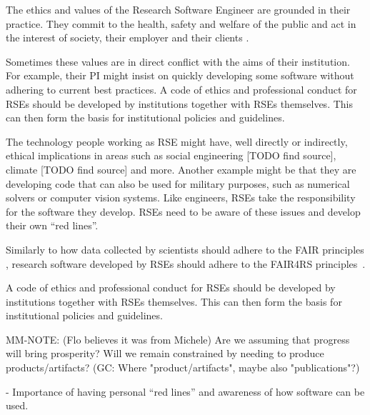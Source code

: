\documentclass{eceasst}
\begin{document}
The ethics and values of the Research Software Engineer are grounded in their practice.
They commit to the health, safety and welfare of the public and act in the interest of society, their employer and their clients \cite{Goth2023}.

Sometimes these values are in direct conflict with the aims of their institution. For example, their PI might insist on quickly developing some software without adhering to current best practices.
A code of ethics and professional conduct for RSEs should be developed by institutions together with RSEs themselves. This can then form the basis for institutional policies and guidelines.

The technology people working as RSE might have, well directly or indirectly, ethical implications in areas such as social engineering [TODO find source], climate [TODO find source] and more.
Another example might be that they are developing code that can also be used for military purposes, such as numerical solvers or computer vision systems.
Like engineers, RSEs take the responsibility for the software they develop.
RSEs need to be aware of these issues and develop their own ``red lines''.

Similarly to how data collected by scientists should adhere to the FAIR principles \cite{FAIR}, research software developed by RSEs should adhere to the FAIR4RS principles~\cite{FAIR4RS}.

A code of ethics and professional conduct for RSEs should be developed by institutions together with RSEs themselves.
This can then form the basis for institutional policies and guidelines.

MM-NOTE: (Flo believes it was from Michele) Are we assuming that progress will bring prosperity? Will we remain constrained by needing to produce products/artifacts? (GC: Where "product/artifacts", maybe also "publications"?)

  - Importance of having personal “red lines” and awareness of how software can be used.
\end{document}
